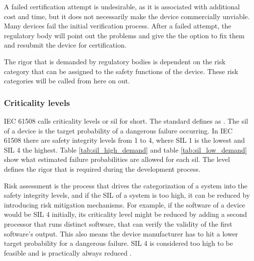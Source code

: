 A failed certification attempt is undesirable, as it is associated with additional cost and time, but it does not necessarily make the device commercially unviable. Many devices fail the initial verification process. After a failed attempt, the regulatory body will point out the problems and give the \mfg{} the option to fix them and resubmit the device for certification.

The rigor that is demanded by regulatory bodies is dependent on the risk category that can be assigned to the safety functions of the device. These risk categories will be called  from here on out. 

\subsubsection{Criticality levels}
IEC 61508 calls criticality levels  or  \acrshort{sil} for short. The standard defines  as \cite{IEC.2000-1}. The \acrshort{sil} of a device is the target probability of a dangerous failure occurring. In IEC 61508 there are safety integrity levels from 1 to 4, where SIL 1 is the lowest and SIL 4 the highest. Table \ref{tab:sil_high_demand} and table \ref{tab:sil_low_demand} show what estimated failure probabilities are allowed for each \acrshort{sil}. The level defines the rigor that is required during the development process.

Risk assessment is the process that drives the categorization of a system into the safety integrity levels, and if the SIL of a system is too high, it can be reduced by introducing risk mitigation mechanisms. For example, if the software of a device would be SIL 4 initially, its criticality level might be reduced by adding a second processor that runs distinct software, that can verify the validity of the first software's output. This also means the device manufacturer has to hit a lower target probability for a dangerous failure.  SIL 4 is considered too high to be feasible and is practically always reduced \cite{MTL2002introduction}.

